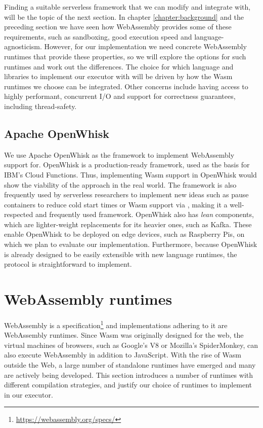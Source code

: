 Finding a suitable serverless framework that we can modify and integrate with, will be the topic of the next section. In chapter \ref{chapter:background} and the preceding section we have seen how WebAssembly provides some of these requirements, such as sandboxing, good execution speed and language-agnosticism. However, for our implementation we need concrete WebAssembly runtimes that provide these properties, so we will explore the options for such runtimes and work out the differences. The choice for which language and libraries to implement our executor with will be driven by how the Wasm runtimes we choose can be integrated. Other concerns include having access to highly performant, concurrent I/O and support for correctness guarantees, including thread-safety.

\subsection{Apache OpenWhisk}

We use Apache OpenWhisk as the framework to implement WebAssembly support for. OpenWhisk is a production-ready framework, used as the basis for IBM's Cloud Functions. Thus, implementing Wasm support in OpenWhisk would show the viability of the approach in the real world. The framework is also frequently used by serverless researchers to implement new ideas such as pause containers to reduce cold start times \cite{Mohan2019} or Wasm support via  \cite{Hall2019}, making it a well-respected and frequently used framework. OpenWhisk also has \emph{lean} components, which are lighter-weight replacements for its heavier ones, such as Kafka. These enable OpenWhisk to be deployed on edge devices, such as Raspberry Pis, on which we plan to evaluate our implementation. Furthermore, because OpenWhisk is already designed to be easily extensible with new language runtimes, the protocol is straightforward to implement.

\section{WebAssembly runtimes}
\label{section:wasm-runtimes}

WebAssembly is a specification\footnote{\url{https://webassembly.org/specs/}} and implementations adhering to it are WebAssembly runtimes. Since Wasm was originally designed for the web, the virtual machines of browsers, such as Google's V8 or Mozilla's SpiderMonkey, can also execute WebAssembly in addition to JavaScript. With the rise of Wasm outside the Web, a large number of standalone runtimes have emerged and many are actively being developed. This section introduces a number of runtimes with different compilation strategies, and justify our choice of runtimes to implement in our executor.


